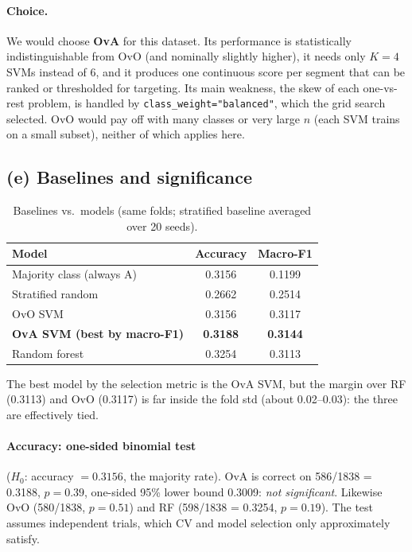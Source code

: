\documentclass[11pt]{article}
\begin{document}
\paragraph{Choice.} We would choose \textbf{OvA} for this dataset. Its performance is statistically
indistinguishable from OvO (and nominally slightly higher), it needs only $K=4$ SVMs instead of 6, and it
produces one continuous score per segment that can be ranked or thresholded for targeting. Its main
weakness, the skew of each one-vs-rest problem, is handled by \texttt{class\_weight="balanced"}, which the
grid search selected. OvO would pay off with many classes or very large $n$ (each SVM trains on a small
subset), neither of which applies here.

\subsection{(e) Baselines and significance}
\begin{table}[H]\centering\small
\caption{Baselines vs.\ models (same folds; stratified baseline averaged over 20 seeds).}\label{tab:base}
\begin{tabular}{@{}lcc@{}}
\toprule
Model & Accuracy & Macro-F1 \\
\midrule
Majority class (always A) & 0.3156 & 0.1199 \\
Stratified random & 0.2662 & 0.2514 \\
OvO SVM & 0.3156 & 0.3117 \\
\textbf{OvA SVM (best by macro-F1)} & \textbf{0.3188} & \textbf{0.3144} \\
Random forest & 0.3254 & 0.3113 \\
\bottomrule
\end{tabular}
\end{table}

The best model by the selection metric is the OvA SVM, but the margin over RF (0.3113) and OvO
(0.3117) is far inside the fold std (about 0.02--0.03): the three are effectively tied.

\paragraph{Accuracy: one-sided binomial test} ($H_0$: accuracy $=0.3156$, the majority rate). OvA is
correct on 586/1838 = 0.3188, \textbf{$p=0.39$}, one-sided 95\% lower bound 0.3009: \emph{not
significant}. Likewise OvO (580/1838, $p=0.51$) and RF (598/1838 = 0.3254, $p=0.19$). The test
assumes independent trials, which CV and model selection only approximately satisfy.
\end{document}
